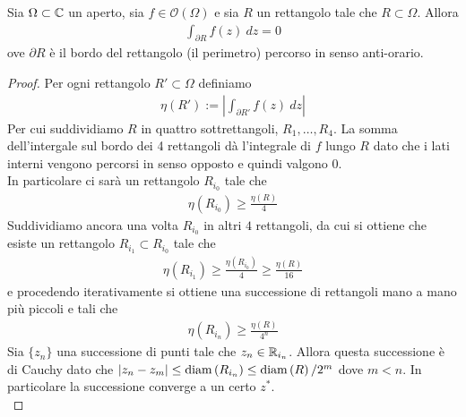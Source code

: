 \begin{theorem}[di Goursat]
	\label{thr:groursat}
	Sia $\Omega \subset \mathbb{C}$ un aperto, sia $f \in \mathcal{O}(\Omega)$ e sia $R$ un rettangolo tale che $R \subset \Omega$. Allora 
	\begin{equation*}
	\begin{aligned}
	\int_{\partial R} f(z)\ dz = 0
	\end{aligned}
	\end{equation*}
	ove $\partial R$ è il bordo del rettangolo (il perimetro) percorso in senso anti-orario.
\end{theorem}
\begin{proof}
	Per ogni rettangolo $R' \subset \Omega$ definiamo 
	\begin{equation*}
	\begin{aligned}
	\eta(R') := \left| \int_{\partial R'} f(z)\ dz\right|
	\end{aligned}
	\end{equation*}
	Per cui suddividiamo $R$ in quattro sottrettangoli, $R_1, \dots, R_4$. La somma dell'intergale sul bordo dei 4 rettangoli dà l'integrale di $f$ lungo $R$ dato che i lati interni vengono percorsi in senso opposto e quindi valgono $0$. \\
	In particolare ci sarà un rettangolo $R_{i_0}$ tale che 
	\begin{equation*}
	\begin{aligned}	
	\eta(R_{i_0}) \ge \frac{\eta(R)}{4} 
	\end{aligned}
	\end{equation*}
	Suddividiamo ancora una volta $R_{i_0}$ in altri $4$ rettangoli, da cui si ottiene che esiste un rettangolo $R_{i_1} \subset R_{i_0}$ tale che 
	\begin{equation*}
	\begin{aligned}
	\eta(R_{i_1}) \ge \frac{\eta(R_{i_0})}{4} \ge \frac{\eta(R)}{16} 
	\end{aligned}
	\end{equation*}
	e procedendo iterativamente si ottiene una successione di rettangoli mano a mano più piccoli e tali che 
	\begin{equation*}
	\begin{aligned}	
	\eta(R_{i_n}) \ge \frac{\eta(R)}{4^n}
	\end{aligned}
	\end{equation*}
	Sia $\{z_n\}$ una successione di punti tale che $z_n \in \mathbb{R}_{i_n}$. Allora questa successione è di Cauchy dato che $|z_n - z_m| \le \operatorname{diam}\left(R_{i_n}\right) \le \operatorname{diam}\left(R\right)/2^m$ dove $m < n$. In particolare la successione converge a un certo $z^*$.\\

\end{proof}
